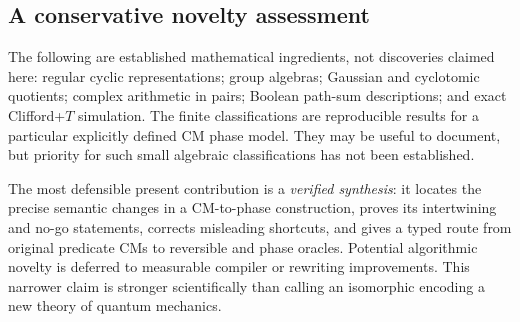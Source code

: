 \subsection{A conservative novelty assessment}
The following are established mathematical ingredients, not discoveries claimed here: regular cyclic representations; group algebras; Gaussian and cyclotomic quotients; complex arithmetic in pairs; Boolean path-sum descriptions; and exact Clifford+$T$ simulation. The finite classifications are reproducible results for a particular explicitly defined CM phase model. They may be useful to document, but priority for such small algebraic classifications has not been established.

The most defensible present contribution is a \emph{verified synthesis}: it locates the precise semantic changes in a CM-to-phase construction, proves its intertwining and no-go statements, corrects misleading shortcuts, and gives a typed route from original predicate CMs to reversible and phase oracles. Potential algorithmic novelty is deferred to measurable compiler or rewriting improvements. This narrower claim is stronger scientifically than calling an isomorphic encoding a new theory of quantum mechanics.
